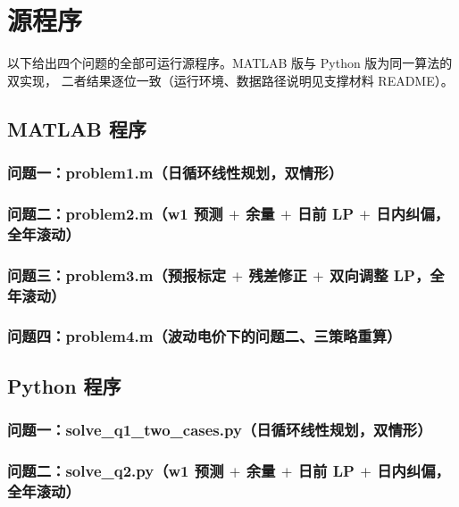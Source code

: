 \section{源程序}

以下给出四个问题的全部可运行源程序。MATLAB 版与 Python 版为同一算法的双实现，
二者结果逐位一致（运行环境、数据路径说明见支撑材料 README）。

\subsection{MATLAB 程序}

\subsubsection{问题一：problem1.m（日循环线性规划，双情形）}


\subsubsection{问题二：problem2.m（w1 预测 $+$ 余量 $+$ 日前 LP $+$ 日内纠偏，全年滚动）}


\subsubsection{问题三：problem3.m（预报标定 $+$ 残差修正 $+$ 双向调整 LP，全年滚动）}


\subsubsection{问题四：problem4.m（波动电价下的问题二、三策略重算）}


\subsection{Python 程序}

\subsubsection{问题一：solve\_q1\_two\_cases.py（日循环线性规划，双情形）}


\subsubsection{问题二：solve\_q2.py（w1 预测 $+$ 余量 $+$ 日前 LP $+$ 日内纠偏，全年滚动）}


